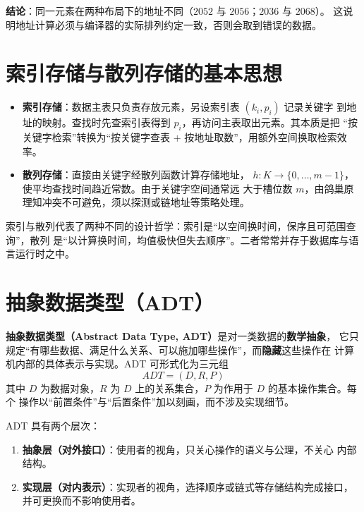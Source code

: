 \textbf{结论}：同一元素在两种布局下的地址不同（$2052$ 与 $2056$；$2036$ 与 $2068$）。
这说明地址计算必须与编译器的实际排列约定一致，否则会取到错误的数据。

\section{索引存储与散列存储的基本思想}

\begin{itemize}
    \item \textbf{索引存储}：数据主表只负责存放元素，另设索引表 $(k_i, p_i)$ 记录关键字
          到地址的映射。查找时先查索引表得到 $p_i$，再访问主表取出元素。其本质是把
          “按关键字检索”转换为“按关键字查表 $+$ 按地址取数”，用额外空间换取检索效率。
    \item \textbf{散列存储}：直接由关键字经散列函数计算存储地址，
          $h: K \to \{0, \dots, m-1\}$，使平均查找时间趋近常数。由于关键字空间通常远
          大于槽位数 $m$，由鸽巢原理知冲突不可避免，须以探测或链地址等策略处理。
\end{itemize}

索引与散列代表了两种不同的设计哲学：索引是“以空间换时间，保序且可范围查询”，散列
是“以计算换时间，均值极快但失去顺序”。二者常常并存于数据库与语言运行时之中。

\section{抽象数据类型（ADT）}

\textbf{抽象数据类型（Abstract Data Type, ADT）}是对一类数据的\textbf{数学抽象}，
它只规定“有哪些数据、满足什么关系、可以施加哪些操作”，而\textbf{隐藏}这些操作在
计算机内部的具体表示与实现。ADT 可形式化为三元组
$$ADT = (D, R, P)$$
其中 $D$ 为数据对象，$R$ 为 $D$ 上的关系集合，$P$ 为作用于 $D$ 的基本操作集合。每个
操作以“前置条件”与“后置条件”加以刻画，而不涉及实现细节。

ADT 具有两个层次：
\begin{enumerate}
    \item \textbf{抽象层（对外接口）}：使用者的视角，只关心操作的语义与公理，不关心
          内部结构。
    \item \textbf{实现层（对内表示）}：实现者的视角，选择顺序或链式等存储结构完成接口，
          并可更换而不影响使用者。
\end{enumerate}

